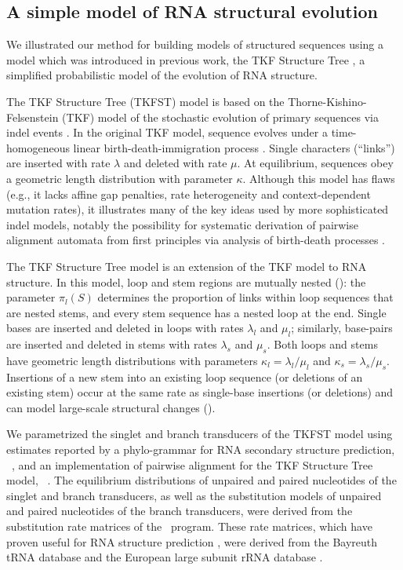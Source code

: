 \documentclass[10pt]{article}
\begin{document}
\subsection*{A simple model of RNA structural evolution}

We illustrated our method for building models of structured sequences
using a model which was introduced in previous work,
the TKF Structure Tree \cite{Holmes2004}, a simplified probabilistic
model of the evolution of RNA structure.

The TKF Structure Tree (TKFST) model is based on the
Thorne-Kishino-Felsenstein (TKF) model of the stochastic evolution of
primary sequences via indel events \cite{ThorneEtal91}.  In the
original TKF model, sequence evolves under a time-homogeneous linear
birth-death-immigration process \cite{Kendall1948}.  Single characters (``links'')
are inserted with rate $\lambda$ and deleted with rate $\mu$.  At
equilibrium, sequences obey a geometric length distribution with
parameter $\kappa$.  Although this model has flaws (e.g., it lacks
affine gap penalties, rate heterogeneity and context-dependent
mutation rates), it illustrates many of the key ideas used by more
sophisticated indel models, notably the possibility for systematic
derivation of pairwise alignment automata from first principles via
analysis of birth-death processes \cite{Feller71,ThorneEtal91}.

The TKF Structure Tree model is an extension of the TKF model to RNA
structure.  In this model, loop and stem regions are
mutually nested ():
the parameter $\pi_l(S)$ determines the proportion of links within loop sequences that are nested stems,
and every stem sequence has a nested loop at the end.
Single bases are inserted and deleted in loops with rates $\lambda_l$ and $\mu_l$;
similarly, base-pairs are inserted and deleted in stems with rates
$\lambda_s$ and $\mu_s$.
Both loops and stems have geometric length
distributions with parameters $\kappa_l = \lambda_l / \mu_l$ and $\kappa_s = \lambda_s / \mu_s$.  
Insertions of a new stem into an existing
loop sequence (or deletions of an existing stem) occur at the same
rate as single-base insertions (or deletions) and can model
large-scale structural changes ().

We parametrized the singlet and branch transducers of the TKFST model
using estimates reported by a phylo-grammar for RNA secondary
structure prediction, \pfold\ \cite{KnudsenHein2003}, and an
implementation of pairwise alignment for the TKF Structure Tree model,
\evoldoer\ \cite{Holmes2004}.
The equilibrium distributions of unpaired and paired nucleotides of
the singlet and branch transducers, as well as the substitution models
of unpaired and paired nucleotides of the branch transducers, were
derived from the substitution rate matrices of the \pfold\ program.
These rate matrices, which have proven useful for RNA structure
prediction \cite{KnudsenHein2003,DowellEddy2004,BradleyEtAl2008},
were derived from the Bayreuth tRNA database \cite{SprinzlEtAl1998}
and the European large subunit rRNA database \cite{DeRijkEtAl1998}.
\end{document}
